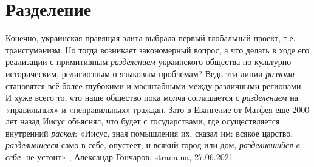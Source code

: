  
 
 
 
 
\chapter{Разделение}
\label{sec:slova.razdelenie}

Конечно, украинская правящая элита выбрала первый глобальный проект, т.е.
трансгуманизм. Но тогда возникает закономерный вопрос, а что делать в ходе его
реализации с примитивным \emph{разделением} украинского общества по
культурно-историческим, религиозным о языковым проблемам? Ведь эти линии
\emph{разлома} становятся всё более глубокими и масштабными между различными
регионами. И хуже всего то, что наше общество пока молча соглашается с
\emph{разделением} на «правильных» и «неправильных» граждан.  Зато в Евангелие от
Матфея еще 2000 лет назад Иисус объяснял, что будет с государствами, где
осуществляется внутренний \emph{раскол}: «Иисус, зная помышления их, сказал им: всякое
царство, \emph{разделившееся} само в себе, опустеет; и всякий город или дом,
\emph{разделившийся в себе}, не устоит»
, 
Александр Гончаров, strana.ua, 27.06.2021

